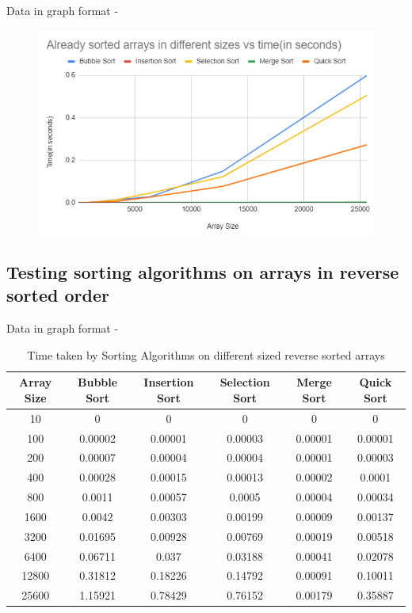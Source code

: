 \documentclass{report}
\begin{document}
Data in graph format - 

\begin{figure}[H]
\centering
\includegraphics[scale=0.8]{sortedarray.png}
\end{figure}



\subsection{Testing sorting algorithms on arrays in reverse sorted order}

Data in graph format - 




\begin{table}[H]
\centering
\begin{tabular}{|c|c|c|c|c|c|}
\hline
\textbf{Array Size} & \textbf{Bubble Sort} & \textbf{Insertion Sort} & \textbf{Selection Sort} & \textbf{Merge Sort} & \textbf{Quick Sort} \\ \hline
10 & 0 & 0 & 0 & 0 & 0 \\ \hline
100 & 0.00002 & 0.00001 & 0.00003 & 0.00001 & 0.00001 \\ \hline
200 & 0.00007 & 0.00004 & 0.00004 & 0.00001 & 0.00003 \\ \hline
400 & 0.00028 & 0.00015 & 0.00013 & 0.00002 & 0.0001 \\ \hline
800 & 0.0011 & 0.00057 & 0.0005 & 0.00004 & 0.00034 \\ \hline
1600 & 0.0042 & 0.00303 & 0.00199 & 0.00009 & 0.00137 \\ \hline
3200 & 0.01695 & 0.00928 & 0.00769 & 0.00019 & 0.00518 \\ \hline
6400 & 0.06711 & 0.037 & 0.03188 & 0.00041 & 0.02078 \\ \hline
12800 & 0.31812 & 0.18226 & 0.14792 & 0.00091 & 0.10011 \\ \hline
25600 & 1.15921 & 0.78429 & 0.76152 & 0.00179 & 0.35887 \\ \hline
\end{tabular}
\caption{Time taken by Sorting Algorithms on different sized reverse sorted arrays}
\end{table}
\end{document}
